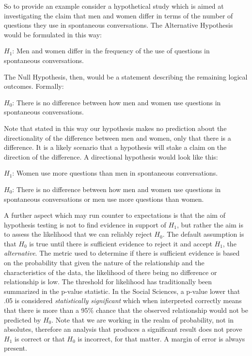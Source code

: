 \documentclass[
]{article}
\begin{document}
So to provide an example consider a hypothetical study which is aimed at investigating the claim that men and women differ in terms of the number of questions they use in spontaneous conversations. The Alternative Hypothesis would be formulated in this way:

\(H_1\): Men and women differ in the frequency of the use of questions in spontaneous conversations.

The Null Hypothesis, then, would be a statement describing the remaining logical outcomes. Formally:

\(H_0\): There is no difference between how men and women use questions in spontaneous conversations.

Note that stated in this way our hypothesis makes no prediction about the directionality of the difference between men and women, only that there is a difference. It is a likely scenario that a hypothesis will stake a claim on the direction of the difference. A directional hypothesis would look like this:

\(H_1\): Women use more questions than men in spontaneous conversations.

\(H_0\): There is no difference between how men and women use questions in spontaneous conversations or men use more questions than women.

A further aspect which may run counter to expectations is that the aim of hypothesis testing is not to find evidence in support of \(H_1\), but rather the aim is to assess the likelihood that we can reliably reject \(H_0\). The default assumption is that \(H_0\) is true until there is sufficient evidence to reject it and accept \(H_1\), the \emph{alternative}. The metric used to determine if there is sufficient evidence is based on the probability that given the nature of the relationship and the characteristics of the data, the likelihood of there being no difference or relationship is low. The threshold for likelihood has traditionally been summarized in the p-value statistic. In the Social Sciences, a p-value lower that .05 is considered \emph{statistically significant} which when interpreted correctly means that there is more than a 95\% chance that the observed relationship would not be predicted by \(H_0\). Note that we are working in the realm of probability, not in absolutes, therefore an analysis that produces a significant result does not prove \(H_1\) is correct or that \(H_0\) is incorrect, for that matter. A margin of error is always present.
\end{document}
